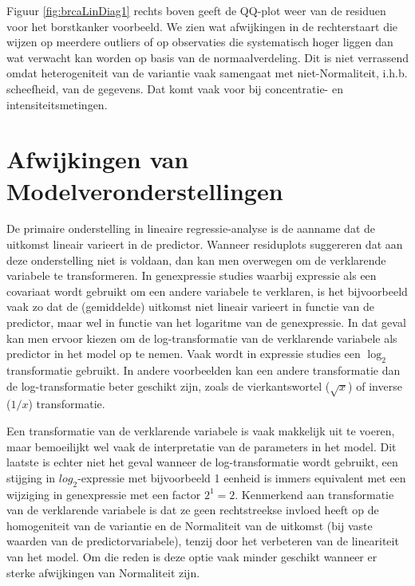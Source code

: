 \documentclass[12pt,dutch,coursenotes]{book}
\theoremstyle{definition}
\theoremstyle{definition}
\theoremstyle{definition}
\theoremstyle{remark}
\begin{document}
Figuur \ref{fig:brcaLinDiag1} rechts boven geeft de QQ-plot weer van de
residuen voor het borstkanker voorbeeld. We zien wat afwijkingen in de
rechterstaart die wijzen op meerdere outliers of op observaties die
systematisch hoger liggen dan wat verwacht kan worden op basis van de
normaalverdeling. Dit is niet verrassend omdat heterogeniteit van de
variantie vaak samengaat met niet-Normaliteit, i.h.b. scheefheid, van de
gegevens. Dat komt vaak voor bij concentratie- en intensiteitsmetingen.

\section{Afwijkingen van
Modelveronderstellingen}\label{afwijkingen-van-modelveronderstellingen}

De primaire onderstelling in lineaire regressie-analyse is de aanname
dat de uitkomst lineair varieert in de predictor. Wanneer residuplots
suggereren dat aan deze onderstelling niet is voldaan, dan kan men
overwegen om de verklarende variabele te transformeren. In genexpressie
studies waarbij expressie als een covariaat wordt gebruikt om een andere
variabele te verklaren, is het bijvoorbeeld vaak zo dat de (gemiddelde)
uitkomst niet lineair varieert in functie van de predictor, maar wel in
functie van het logaritme van de genexpressie. In dat geval kan men
ervoor kiezen om de log-transformatie van de verklarende variabele als
predictor in het model op te nemen. Vaak wordt in expressie studies een
\(\log_2\) transformatie gebruikt. In andere voorbeelden kan een andere
transformatie dan de log-transformatie beter geschikt zijn, zoals de
vierkantswortel (\(\sqrt{x}\)) of inverse (\(1/x\)) transformatie.

Een transformatie van de verklarende variabele is vaak makkelijk uit te
voeren, maar bemoeilijkt wel vaak de interpretatie van de parameters in
het model. Dit laatste is echter niet het geval wanneer de
log-transformatie wordt gebruikt, een stijging in \(log_2\)-expressie
met bijvoorbeeld 1 eenheid is immers equivalent met een wijziging in
genexpressie met een factor \(2^1=2\). Kenmerkend aan transformatie van
de verklarende variabele is dat ze geen rechtstreekse invloed heeft op
de homogeniteit van de variantie en de Normaliteit van de uitkomst (bij
vaste waarden van de predictorvariabele), tenzij door het verbeteren van
de lineariteit van het model. Om die reden is deze optie vaak minder
geschikt wanneer er sterke afwijkingen van Normaliteit zijn.
\end{document}
